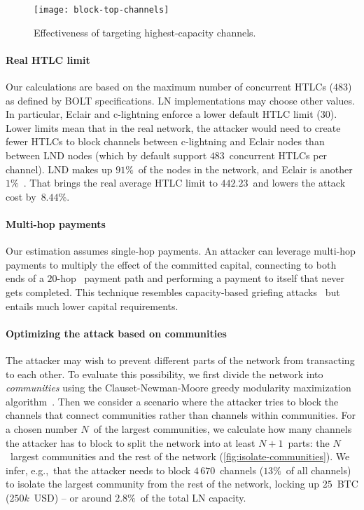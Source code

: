 \begin{figure}[tb]
	\centering
	\texttt{[image: block-top-channels]}
	\caption{Effectiveness of targeting highest-capacity channels.}
	\label{fig:block-top-channels}
\end{figure}

\paragraph{Real HTLC limit}
Our calculations are based on the maximum number of concurrent HTLCs ($483$) as defined by BOLT specifications.
LN implementations may choose other values.
In particular, Eclair and c-lightning enforce a lower default HTLC limit ($30$).
Lower limits mean that in the real network, the attacker would need to create fewer HTLCs to block channels between c-lightning and Eclair nodes than between LND nodes (which by default support $483$~concurrent HTLCs per channel).
LND makes up $91\%$~of the nodes in the network, and Eclair is another $1\%$~\cite{Mizrahi2020}.
That brings the real average HTLC limit to $442.23$~and lowers the attack cost by~$8.44\%$.

\paragraph{Multi-hop payments}
Our estimation assumes single-hop payments.
An attacker can leverage multi-hop payments to multiply the effect of the committed capital, connecting to both ends of a $20$-hop~\cite{Bolt4OnionRouting} payment path and performing a payment to itself that never gets completed.
This technique resembles capacity-based griefing attacks~\cite{PerezSola2019,Rohrer2019} but entails much lower capital requirements.

\paragraph{Optimizing the attack based on communities}
The attacker may wish to prevent different parts of the network from transacting to each other.
To evaluate this possibility, we first divide the network into \textit{communities} using the Clauset-Newman-Moore greedy modularity maximization algorithm~\cite{Clauset2004}.
Then we consider a scenario where the attacker tries to block the channels that connect communities rather than channels within communities.
For a chosen number $N$~of the largest communities, we calculate how many channels the attacker has to block to split the network into at least $N+1$~parts: the $N$~largest communities and the rest of the network (\cref{fig:isolate-communities}).
We infer, e.g.,~that the attacker needs to block $4\,670$~channels ($13\%$~of all channels) to isolate the largest community from the rest of the network, locking up $25$~BTC ($250k$~USD) -- or around $2.8\%$~of the total LN capacity.

